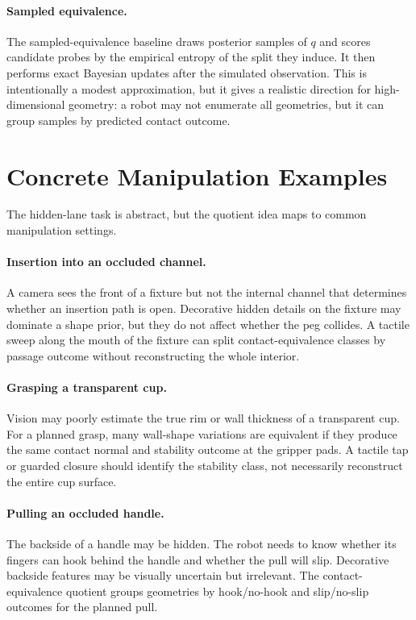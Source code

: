 \documentclass{article}
\begin{document}
\paragraph{Sampled equivalence.}
The sampled-equivalence baseline draws posterior samples of $q$ and scores candidate probes by the empirical entropy of the split they induce. It then performs exact Bayesian updates after the simulated observation. This is intentionally a modest approximation, but it gives a realistic direction for high-dimensional geometry: a robot may not enumerate all geometries, but it can group samples by predicted contact outcome.

\section{Concrete Manipulation Examples}

The hidden-lane task is abstract, but the quotient idea maps to common manipulation settings.

\paragraph{Insertion into an occluded channel.}
A camera sees the front of a fixture but not the internal channel that determines whether an insertion path is open. Decorative hidden details on the fixture may dominate a shape prior, but they do not affect whether the peg collides. A tactile sweep along the mouth of the fixture can split contact-equivalence classes by passage outcome without reconstructing the whole interior.

\paragraph{Grasping a transparent cup.}
Vision may poorly estimate the true rim or wall thickness of a transparent cup. For a planned grasp, many wall-shape variations are equivalent if they produce the same contact normal and stability outcome at the gripper pads. A tactile tap or guarded closure should identify the stability class, not necessarily reconstruct the entire cup surface.

\paragraph{Pulling an occluded handle.}
The backside of a handle may be hidden. The robot needs to know whether its fingers can hook behind the handle and whether the pull will slip. Decorative backside features may be visually uncertain but irrelevant. The contact-equivalence quotient groups geometries by hook/no-hook and slip/no-slip outcomes for the planned pull.
\end{document}
